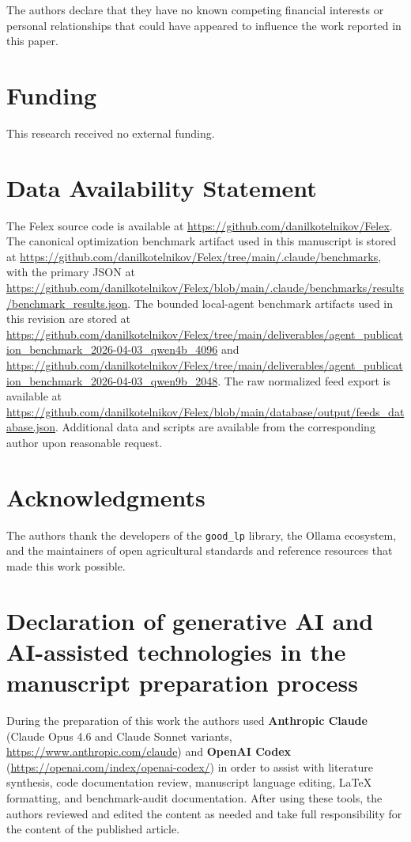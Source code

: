 \documentclass[a4paper,fleqn]{cas-dc}
\begin{document}
The authors declare that they have no known competing financial interests or personal relationships that could have appeared to influence the work reported in this paper.

\section*{Funding}

This research received no external funding.

\section*{Data Availability Statement}

The Felex source code is available at \url{https://github.com/danilkotelnikov/Felex}. The canonical optimization benchmark artifact used in this manuscript is stored at \url{https://github.com/danilkotelnikov/Felex/tree/main/.claude/benchmarks}, with the primary JSON at \url{https://github.com/danilkotelnikov/Felex/blob/main/.claude/benchmarks/results/benchmark_results.json}. The bounded local-agent benchmark artifacts used in this revision are stored at \url{https://github.com/danilkotelnikov/Felex/tree/main/deliverables/agent_publication_benchmark_2026-04-03_qwen4b_4096} and \url{https://github.com/danilkotelnikov/Felex/tree/main/deliverables/agent_publication_benchmark_2026-04-03_qwen9b_2048}. The raw normalized feed export is available at \url{https://github.com/danilkotelnikov/Felex/blob/main/database/output/feeds_database.json}. Additional data and scripts are available from the corresponding author upon reasonable request.

\section*{Acknowledgments}

The authors thank the developers of the \texttt{good\_lp} library, the Ollama ecosystem, and the maintainers of open agricultural standards and reference resources that made this work possible.

\section*{Declaration of generative AI and AI-assisted technologies in the manuscript preparation process}

During the preparation of this work the authors used \textbf{Anthropic Claude} (Claude Opus 4.6 and Claude Sonnet variants, \url{https://www.anthropic.com/claude}) and \textbf{OpenAI Codex} (\url{https://openai.com/index/openai-codex/}) in order to assist with literature synthesis, code documentation review, manuscript language editing, LaTeX formatting, and benchmark-audit documentation. After using these tools, the authors reviewed and edited the content as needed and take full responsibility for the content of the published article.

\printcredits



\end{document}

